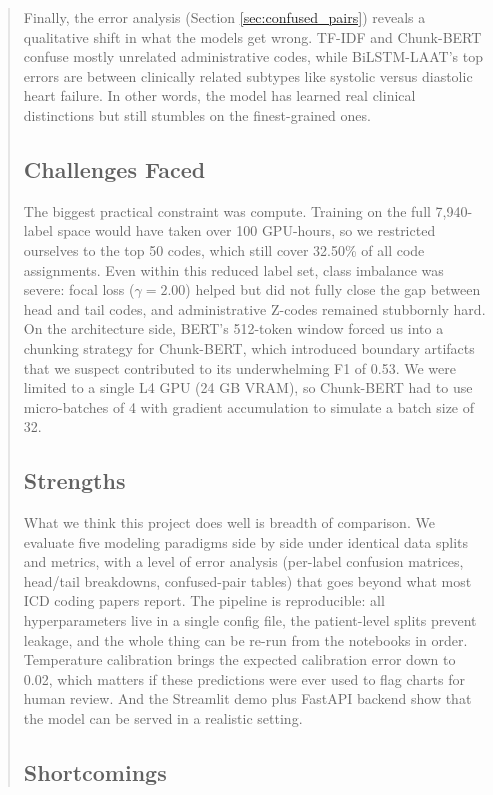 \documentclass[11pt,a4paper]{article}
\begin{document}
\begin{abstract}
Finally, the error analysis (Section \ref{sec:confused_pairs}) reveals a qualitative shift in what the models get wrong. TF-IDF and Chunk-BERT confuse mostly unrelated administrative codes, while BiLSTM-LAAT's top errors are between clinically related subtypes like systolic versus diastolic heart failure. In other words, the model has learned real clinical distinctions but still stumbles on the finest-grained ones.

\subsection{Challenges Faced}

The biggest practical constraint was compute. Training on the full 7,940-label space would have taken over 100 GPU-hours, so we restricted ourselves to the top 50 codes, which still cover 32.50\% of all code assignments. Even within this reduced label set, class imbalance was severe: focal loss ($\gamma = 2.00$) helped but did not fully close the gap between head and tail codes, and administrative Z-codes remained stubbornly hard. On the architecture side, BERT's 512-token window forced us into a chunking strategy for Chunk-BERT, which introduced boundary artifacts that we suspect contributed to its underwhelming F1 of 0.53. We were limited to a single L4 GPU (24 GB VRAM), so Chunk-BERT had to use micro-batches of 4 with gradient accumulation to simulate a batch size of 32.

\subsection{Strengths}

What we think this project does well is breadth of comparison. We evaluate five modeling paradigms side by side under identical data splits and metrics, with a level of error analysis (per-label confusion matrices, head/tail breakdowns, confused-pair tables) that goes beyond what most ICD coding papers report. The pipeline is reproducible: all hyperparameters live in a single config file, the patient-level splits prevent leakage, and the whole thing can be re-run from the notebooks in order. Temperature calibration brings the expected calibration error down to 0.02, which matters if these predictions were ever used to flag charts for human review. And the Streamlit demo plus FastAPI backend show that the model can be served in a realistic setting.

\subsection{Shortcomings}


\end{abstract}
\end{document}
